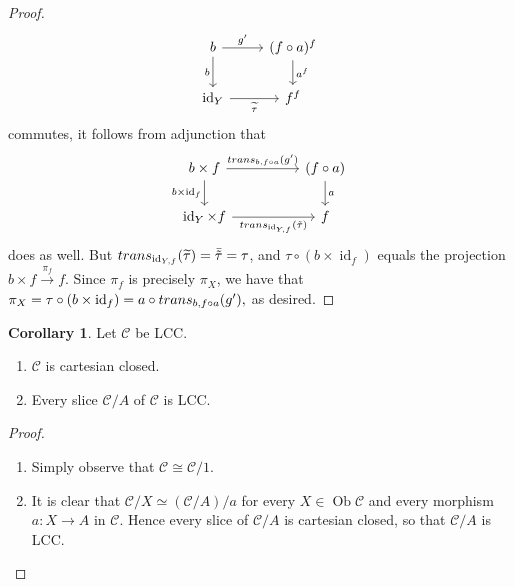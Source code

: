 \documentclass[10pt,letterpaper,cm]{nupset}
\theoremstyle{definition}
\theoremstyle{theorem}
\newtheorem{corollary}[definition]{Corollary}
\theoremstyle{remark}
\DeclareMathOperator{\ob}{Ob}
\newcommand{\0}{\mathbf{0}}
\newcommand{\1}{\mathbf{1}}
\newcommand{\2}{\mathbf{2}}
\renewcommand{\c}{\mathscr{C}}
\DeclareMathOperator{\idd}{id}
\DeclareMathOperator{\trans}{\mathnormal{trans}}
\newcommand{\be}{\begin{enumerate}}
\newcommand{\ee}{\end{enumerate}}
\begin{document}
\begin{proof}
\[\begin{tikzcd}
b \arrow[d, "b"'] \arrow[r, "g'"]      & (f\circ a)^f \arrow[d, "a^f"] \\
\idd_Y \arrow[r, "\widetilde{\tau}"'] & f^f                          
\end{tikzcd}
\] 
commutes, it follows from adjunction that
\[
\begin{tikzcd}[column sep =huge]
b \times f \arrow[d, "b \times \idd_f"'] \arrow[r, "{\trans_{b, f\circ a}(g')}"] & (f\circ a) \arrow[d, "a"] \\
\idd_Y \times f \arrow[r, "{\trans_{\idd_{Y, f}}(\tilde{\tau})}"']            & f                        
\end{tikzcd}
\] 
does as well. But $\trans_{\idd_{Y, f}}(\widetilde{\tau}) = \bar{\tilde{\tau}} = \tau$, and $\tau \circ \left(b \times \idd_f\right)$ equals the projection $b \times f \overset{\pi_f}{\longrightarrow} f$. Since $\pi_f$ is precisely $\pi_X$, we have that  $\pi_X = \tau \circ \left(b \times \idd_f\right) = a \circ \trans_{b, f\circ a}(g'), $ as desired. 
\end{proof}

\pagebreak

\begin{corollary} Let $\c$ be LCC.
\be
\item $\c$ is cartesian closed.
\item Every slice $\c/A$ of $\c$ is LCC.
\ee
\end{corollary}
\begin{proof} $ $
\be
\item  Simply observe that $\c \cong \c/1$.
\item It is clear that $\c/X \simeq \left(\c/A\right)/a$ for every $X\in \ob{\c}$ and every morphism $a: X\to A$ in $\c$. Hence every slice of $\c/A$ is cartesian closed, so that $\c/A$ is LCC.
\ee
\end{proof}

\smallskip
\end{document}
